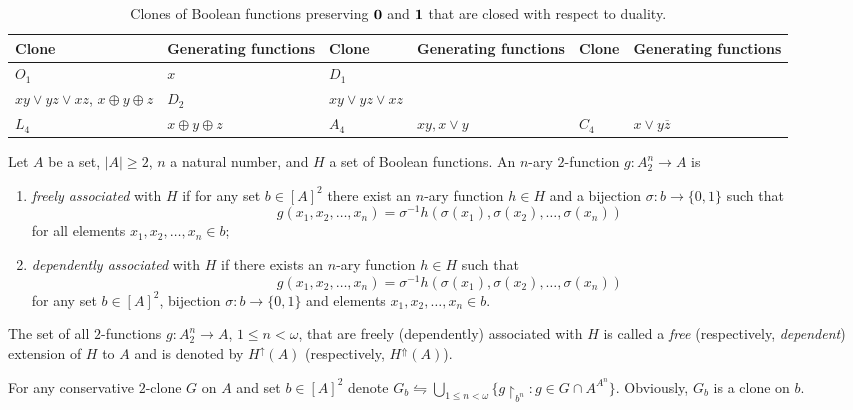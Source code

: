 \documentclass[graybox]{SNmult}
\theoremstyle{definition}
\begin{document}
\renewcommand{\arraystretch}{1.5}
\begin{table}[h!]\centering
	\caption{Clones of Boolean functions preserving $\textbf 0$ and $\textbf 1$ that are closed with respect to duality.}\label{tab11}
	\begin{tabular}{|l|l|l|l|l|l|}
		\hline
		Clone &  Generating functions & Clone & Generating functions& Clone & Generating functions\\
		\hline
		$O_1$ &  $x$ & $D_1$ & \begin{minipage}[b]{0.27\textwidth} \vspace{0.1cm}$\overline xy\vee \overline yz\vee yz$ or\\ $xy\vee yz\vee xz$, $x\oplus y\oplus z$\end{minipage}  & $D_2$ & $xy\vee yz\vee xz$\\
		\hline
		$L_4$ &  $x\oplus y\oplus z$ & $A_4$ & $xy, x\vee y$ & $C_4$ & $x\vee  y\overline z$\\
		\hline
	\end{tabular}
\end{table}
\begin{definition}
	Let $A$ be a set, $|A|\geq 2$, $n$ a natural number, and $H$ a set of Boolean functions. An $n$-ary $2$-function $g:A^n_2\to A$ is 
	\begin{enumerate}
		\item\textit{freely associated} with $H$ if for any set $b\in [A]^2$ there exist an $n$-ary function $h\in H$ and a bijection $\sigma: b\to \{0,1\}$ such that
		$$
		g(x_1, x_2, \ldots, x_n)=\sigma^{-1}h(\sigma(x_1), \sigma(x_2), \ldots, \sigma(x_n))
		$$
		for all elements $x_1, x_2, \ldots, x_n\in b$;
		\item\textit{dependently associated} with $H$ if there exists an $n$-ary function $h\in H$ such that
		$$
		g(x_1, x_2, \ldots, x_n)=\sigma^{-1}h(\sigma(x_1), \sigma(x_2), \ldots, \sigma(x_n))
		$$
		for any set $b\in [A]^2$, bijection $\sigma: b\to \{0,1\}$ and elements $x_1, x_2, \ldots, x_n\in b$.
	\end{enumerate}
	The set of all $2$-functions $g:A^n_2\to A$, $1\leq n<\omega$, that are freely (dependently) associated with $H$ is called a \textit{free} (respectively, \textit{dependent}) extension of $H$ to $A$ and is denoted by $H^\uparrow(A)$ (respectively, $H^\Uparrow(A)$). 
\end{definition}
For any conservative $2$-clone $G$ on $A$ and set $b\in [A]^2$ denote $G_b\leftrightharpoons \bigcup_{1\leq n<\omega}\{g\restriction_{b^n}: g\in G\cap A^{A^n}\}$. Obviously, $G_b$ is a clone on $b$.
\end{document}
